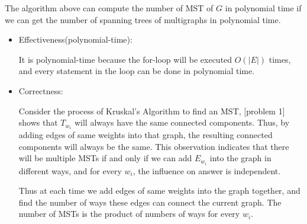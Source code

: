     The algorithm above can compute the number of MST of $G$ in polynomial time if we can get the number of spanning trees of multigraphs in polynomial time.
    \begin{itemize}
        \item Effectiveness(polynomial-time):
        
        It is polynomial-time because the for-loop will be executed $O(|E|)$ times, and every statement in the loop can be done in polynomial time.
        
        \item Correctness:
        
        Consider the process of Kruskal's Algorithm to find an MST, [problem 1] shows that $T_{w_i}$ will always have the same connected components. Thus, by adding edges of same weights into that graph, the resulting connected components will always be the same. This observation indicates that there will be multiple MSTs if and only if we can add $E_{w_i}$ into the graph in different ways, and for every $w_i$, the influence on answer is independent.
        
        Thus at each time we add edges of same weights into the graph together, and find the number of ways these edges can connect the current graph. The number of MSTs is the product of numbers of ways for every $w_i$.
        
        
    \end{itemize}


